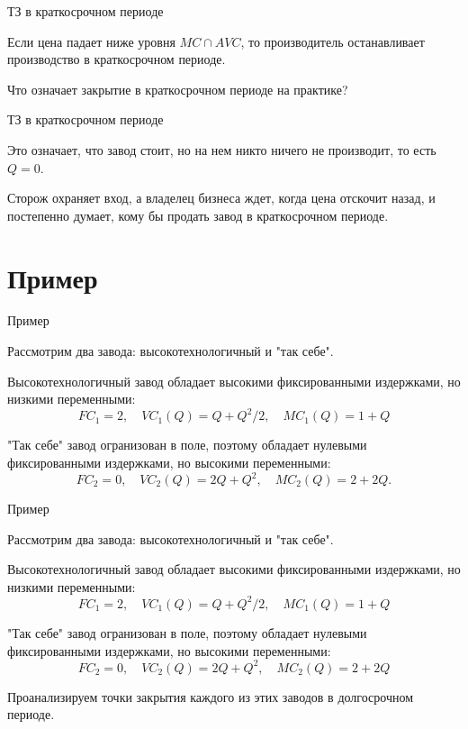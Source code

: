 \documentclass{beamer}
\begin{document}
\begin{frame}{ТЗ в краткосрочном периоде}

\begin{lemma}
Если цена падает ниже уровня $MC \cap AVC$, то производитель останавливает производство в краткосрочном периоде.
\end{lemma}

Что означает закрытие в краткосрочном периоде на практике?

\end{frame}

\begin{frame}{ТЗ в краткосрочном периоде}

Это означает, что завод стоит, но на нем никто ничего не производит, то есть $Q=0$. 

Сторож охраняет вход, а владелец бизнеса ждет, когда цена отскочит назад, и постепенно думает, кому бы продать завод в краткосрочном периоде.

\end{frame}

\section{Пример}

\begin{frame}{Пример}

Рассмотрим два завода: высокотехнологичный и "так себе". 

Высокотехнологичный завод обладает высокими фиксированными издержками, но низкими переменными:
$$FC_1 = 2, \quad VC_1(Q) = Q + Q^2/2, \quad MC_1(Q) = 1 + Q$$

"Так себе" завод огранизован в поле, поэтому обладает нулевыми фиксированными издержками, но высокими переменными:
$$FC_2 = 0, \quad VC_2(Q) = 2Q + Q^2, \quad MC_2(Q) = 2 + 2Q.$$

\end{frame}

\begin{frame}{Пример}

Рассмотрим два завода: высокотехнологичный и "так себе". 

Высокотехнологичный завод обладает высокими фиксированными издержками, но низкими переменными:
$$FC_1 = 2, \quad VC_1(Q) = Q + Q^2/2, \quad MC_1(Q) = 1 + Q$$

"Так себе" завод огранизован в поле, поэтому обладает нулевыми фиксированными издержками, но высокими переменными:
$$FC_2 = 0, \quad VC_2(Q) = 2Q + Q^2, \quad MC_2(Q) = 2 + 2Q$$

Проанализируем точки закрытия каждого из этих заводов в долгосрочном периоде.

\end{frame}
\end{document}
